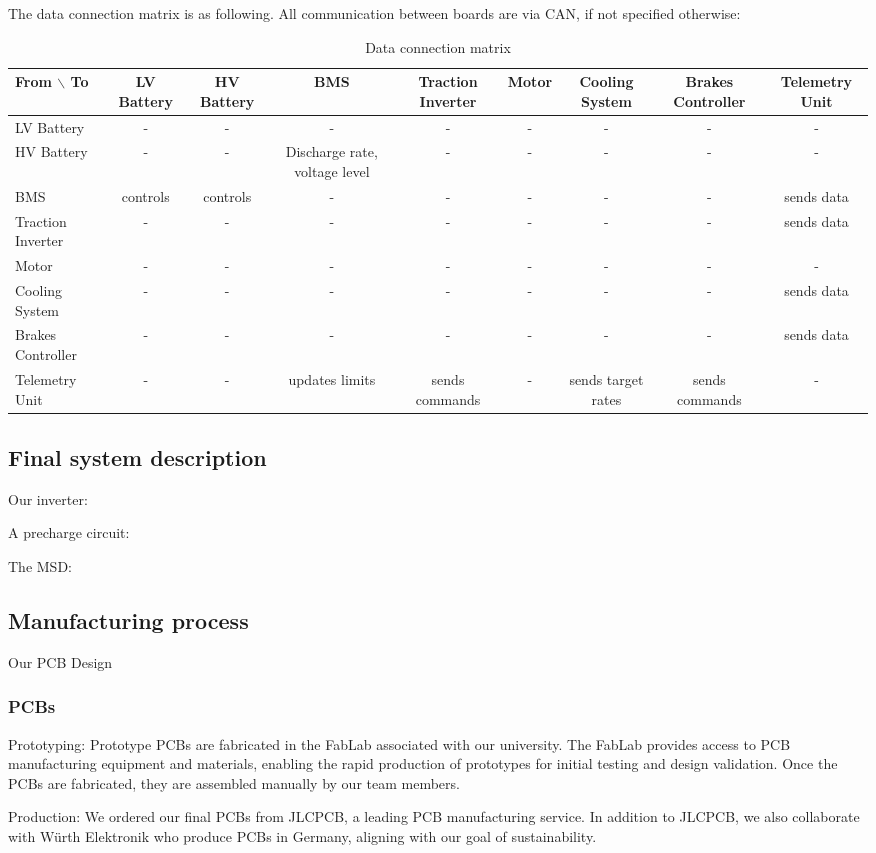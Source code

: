 The data connection matrix is as following. All communication between boards are via CAN, if not specified otherwise:

\begin{table}
    \centering
    \begin{adjustbox}{width=\textwidth,center}
    \begin{tabular}{|l|c|c|c|c|c|c|c|c|}
    \hline
    From $\backslash$ To & LV Battery & HV Battery & BMS & Traction Inverter & Motor & Cooling System & Brakes Controller & Telemetry Unit  \\
    \hline
    LV Battery & - & - & - & - & - & - & - & - \\
    HV Battery  & - & - & Discharge rate, voltage level & - & - & - & - & - \\
    BMS & controls & controls & - & - & - & - & - & sends data \\
    Traction Inverter & - & - & - & - & - & - & - & sends data \\
    Motor & - & - & - & - & - & - & - & - \\
    Cooling System & - & - & - & - & - & - & - & sends data \\
    Brakes Controller & - & - & - & - & - & - & - & sends data \\
    Telemetry Unit & - & - & updates limits & sends commands & - & sends target rates & sends commands & - \\
    \hline
    \end{tabular}
    \end{adjustbox}
    \caption{Data connection matrix}
    \label{data-connectivity-matrix}
\end{table}


\subsection{Final system description}
Our inverter:


A precharge circuit:

The MSD:




\subsection{Manufacturing process}
Our PCB Design
\subsubsection{PCBs}
\par Prototyping: Prototype PCBs are fabricated in the FabLab associated with our university. The FabLab provides access to PCB manufacturing equipment and materials, enabling the rapid production of prototypes for initial testing and design validation.
    Once the PCBs are fabricated, they are assembled manually by our team members. 
\par Production: We ordered our final PCBs from JLCPCB, a leading PCB manufacturing service. In addition to JLCPCB, we also collaborate with Würth Elektronik who produce 
PCBs in Germany, aligning with our goal of sustainability.

